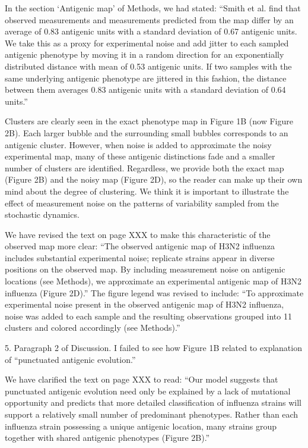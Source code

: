 \documentclass[11pt,oneside,letterpaper]{article}
\def\comment#1{
#1
}
\def\response#1{
\begin{bf}
#1
\end{bf}
}
\def\break{\vspace{0.2cm}}
\begin{document}
\response{In the section `Antigenic map' of Methods, we had stated: ``Smith et al. find that observed measurements and measurements predicted from the map differ by an average of 0.83 antigenic units with a standard deviation of 0.67 antigenic units. We take this as a proxy for experimental noise and add jitter to each sampled antigenic phenotype by moving it in a random direction for an exponentially distributed distance with mean of 0.53 antigenic units.  If two samples with the same underlying antigenic phenotype are jittered in this fashion, the distance between them averages 0.83 antigenic units with a standard deviation of 0.64 units.''}

\response{Clusters are clearly seen in the exact phenotype map in Figure 1B (now Figure 2B).  Each larger bubble and the surrounding small bubbles corresponds to an antigenic cluster.  However, when noise is added to approximate the noisy experimental map, many of these antigenic distinctions fade and a smaller number of clusters are identified.  Regardless, we provide both the exact map (Figure 2B) and the noisy map (Figure 2D), so the reader can make up their own mind about the degree of clustering.  We think it is important to illustrate the effect of measurement noise on the patterns of variability sampled from the stochastic dynamics.}

\response{We have revised the text on page XXX to make this characteristic of the observed map more clear: ``The observed antigenic map of H3N2 influenza includes substantial experimental noise; replicate strains appear in diverse positions on the observed map.  By including measurement noise on antigenic locations (see Methods), we approximate an experimental antigenic map of H3N2 influenza (Figure 2D).''  The figure legend was revised to include: ``To approximate experimental noise present in the observed antigenic map of H3N2 influenza, noise was added to each sample and the resulting observations grouped into 11 clusters and colored accordingly (see Methods).''}

\break

\comment{5. Paragraph 2 of Discussion. I failed to see how Figure 1B related to explanation of ``punctuated antigenic evolution.''}

\response{We have clarified the text on page XXX to read: ``Our model suggests that punctuated antigenic evolution need only be explained by a lack of mutational opportunity and predicts that more detailed classification of influenza strains will support a relatively small number of predominant phenotypes.  Rather than each influenza strain possessing a unique antigenic location, many strains group together with shared antigenic phenotypes (Figure 2B).''}
\end{document}

